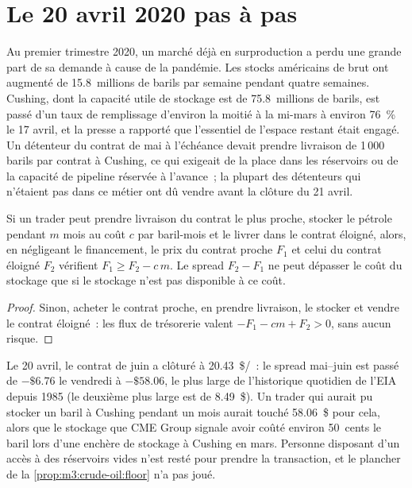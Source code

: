 \section{Le 20 avril 2020 pas à pas}

Au premier trimestre 2020, un marché déjà en surproduction a perdu une grande part de
sa demande à cause de la pandémie. Les stocks américains de brut ont augmenté de 15.8~millions de barils par semaine pendant
quatre semaines. Cushing, dont la capacité utile de stockage est de 75.8~millions de barils, est passé
d'un taux de remplissage d'environ la moitié à la mi-mars à environ 76~\% le 17 avril, et la presse
a rapporté que l'essentiel de l'espace restant était engagé. Un détenteur du contrat de mai à l'échéance
devait prendre livraison de 1\,000 barils par contrat à Cushing, ce qui exigeait de la place dans les
réservoirs ou de la capacité de pipeline réservée à l'avance~; la plupart des détenteurs qui n'étaient
pas dans ce métier ont dû vendre avant la clôture du 21 avril.

\begin{proposition}\label{prop:m3:crude-oil:floor}
Si un trader peut prendre livraison du contrat le plus proche, stocker le pétrole pendant $m$ mois au
coût $c$ par baril-mois et le livrer dans le contrat éloigné, alors, en négligeant
le financement, le prix du contrat proche $F_1$ et celui du contrat éloigné $F_2$ vérifient
$F_1 \ge F_2 - c\,m$. Le spread $F_2 - F_1$ ne peut dépasser le coût du stockage que
si le stockage n'est pas disponible à ce coût.
\end{proposition}

\begin{proof}
Sinon, acheter le contrat proche, en prendre livraison, le stocker et vendre le contrat éloigné~:
les flux de trésorerie valent $-F_1 - cm + F_2 > 0$, sans aucun risque.
\end{proof}

Le 20 avril, le contrat de juin a clôturé à \qty{20.43}{\$/\barrel}~: le spread mai--juin
est passé de $-\$6.76$ le vendredi à $-\$58.06$, le plus large de l'historique quotidien de l'EIA
depuis 1985 (le deuxième plus large est de 8.49~\$). Un trader qui aurait pu stocker un
baril à Cushing pendant un mois aurait touché 58.06~\$ pour cela, alors que le stockage que CME Group
signale avoir coûté environ 50~cents le baril lors d'une enchère de stockage à Cushing en mars. Personne disposant
d'un accès à des réservoirs vides n'est resté pour prendre la transaction, et le plancher de
la \cref{prop:m3:crude-oil:floor} n'a pas joué.

